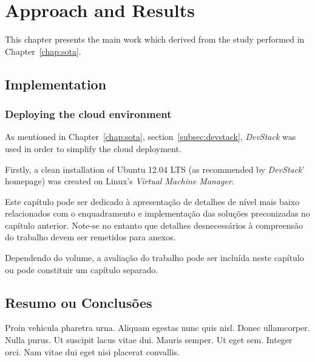 \chapter{Approach and Results}\label{chap:chap4}


This chapter presents the main work which derived from the study performed in Chapter~\ref{chap:sota}.

\section*{}

\section{Implementation}\label{sec:implementation}

\subsection{Deploying the cloud environment}\label{subsec:cloud_env}

As mentioned in Chapter~\ref{chap:sota}, section~\ref{subsec:devstack}, \textit{DevStack} was used in order to simplify the cloud deployment.

Firstly, a clean installation of Ubuntu 12.04 LTS (as recommended by \textit{DevStack}' homepage) was created on Linux's \textit{Virtual Machine Manager}.


Este capítulo pode ser dedicado à apresentação de detalhes de nível
mais baixo relacionados com o enquadramento e implementação das
soluções preconizadas no capítulo anterior.
Note-se no entanto que detalhes desnecessários à compreensão do
trabalho devem ser remetidos para anexos.

Dependendo do volume, a avaliação do trabalho pode ser incluída neste
capítulo ou pode constituir um capítulo separado.

\section{Resumo ou Conclusões}

Proin vehicula pharetra urna. Aliquam egestas
nunc quis nisl. Donec ullamcorper. Nulla purus. Ut suscipit lacus
vitae dui. Mauris semper. Ut eget sem. Integer orci. Nam vitae dui
eget nisi placerat convallis. 
